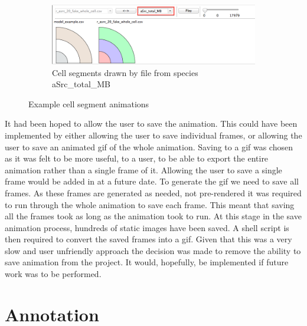 \begin{figure}[h!]
    \begin{subfigure}[b]{0.9\textwidth}
        \centering
        \includegraphics[width=\textwidth]{images/by_species_asrc.png}
        \caption{Cell segments drawn by file from species aSrc\_total\_MB}
        \label{fig:cell_seg_species}
    \end{subfigure}
    \caption{Example cell segment animations}
    \label{fig:cell_segments}
\end{figure}

It had been hoped to allow the user to save the animation.  This could have been implemented by either allowing the user to save individual frames, or allowing the user to save an animated gif of the whole animation.  Saving to a gif was chosen as it was felt to be more useful, to a user, to be able to export the entire animation rather than a single frame of it.  Allowing the user to save a single frame would be added in at a future date.  To generate the gif we need to save all frames.  As these frames are generated as needed, not pre-rendered it was required to run through the whole animation to save each frame.  This meant that saving all the frames took as long as the animation took to run.  At this stage in the save animation process, hundreds of static images have been saved.  A shell script is then required to convert the saved frames into a gif.  Given that this was a very slow and user unfriendly approach the decision was made to remove the ability to save animation from the project.  It would, hopefully, be implemented if future work was to be performed.

\section{Annotation}

